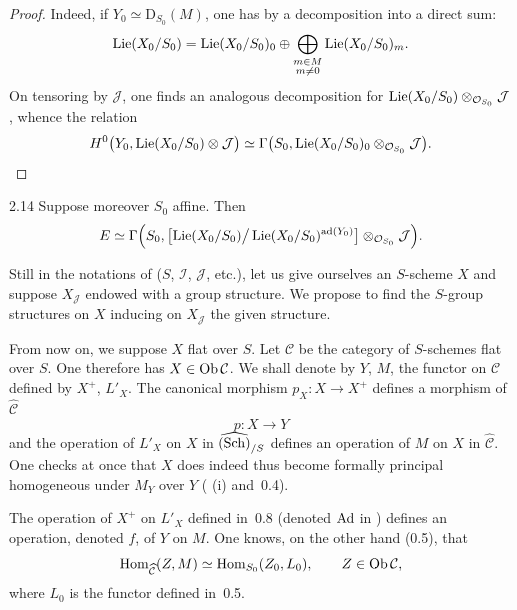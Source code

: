 \begin{proof}
\renewcommand{\qedsymbol}{}
Indeed, if \(Y_{0}\simeq\mathrm{D}_{S_{0}}(M)\), one has by \loccit a
decomposition into a direct sum:
\[
\operatorname{Lie}(X_{0}/S_{0})
  =\operatorname{Lie}(X_{0}/S_{0})_{0}
  \oplus
  \bigoplus_{\substack{m\in M\\ m\neq 0}}\operatorname{Lie}(X_{0}/S_{0})_{m}.
\]
On tensoring by \(\mathcal{J}\), one finds an analogous decomposition for
\(\operatorname{Lie}(X_{0}/S_{0})\otimes_{\mathcal{O}_{S_{0}}}\mathcal{J}\), whence the
relation
\[
H^{0}\bigl(Y_{0},\operatorname{Lie}(X_{0}/S_{0})\otimes\mathcal{J}\bigr)
  \simeq
  \Gamma\bigl(S_{0},\operatorname{Lie}(X_{0}/S_{0})_{0}\otimes_{\mathcal{O}_{S_{0}}}
    \mathcal{J}\bigr).
\]
\end{proof}

\begin{corollary}{2.14}\label{III.2.14}
Suppose moreover \(S_{0}\) affine. Then
\[
E\simeq\Gamma\Bigl(S_{0},
  \bigl[\operatorname{Lie}(X_{0}/S_{0})\big/\operatorname{Lie}(X_{0}/S_{0})^{\mathrm{ad}(Y_{0})}\bigr]
  \otimes_{\mathcal{O}_{S_{0}}}\mathcal{J}\Bigr).
\]
\end{corollary}

\label{III.sec.3}

Still in the notations of  (\(S\), \(\mathcal{I}\), \(\mathcal{J}\),
etc.), let us give ourselves an \(S\)-scheme \(X\) and suppose \(X_{\mathcal{J}}\)
endowed with a group structure. We propose to find the \(S\)-group structures
on \(X\) inducing on \(X_{\mathcal{J}}\) the given structure.

From now on, we suppose \(X\) flat over \(S\). Let \(\mathcal{C}\) be the
category of \(S\)-schemes flat over \(S\). One therefore has
\(X\in\operatorname{Ob}\mathcal{C}\). We shall denote by \(Y\), \resp \(M\), the functor on
\(\mathcal{C}\) defined by \(X^{+}\), \resp \(L'_{X}\). The canonical morphism
\(p_{X}\colon X\to X^{+}\) defines a morphism of \(\widehat{\mathcal{C}}\)
\[
p\colon X\longrightarrow Y
\]
and the operation of \(L'_{X}\) on \(X\) in \(\widehat{\textup{(Sch)}}_{/S}\) defines an
operation of \(M\) on \(X\) in \(\widehat{\mathcal{C}}\). One checks at once
that \(X\) does indeed thus become formally principal homogeneous under
\(M_{Y}\) over \(Y\) ( (i) and~0.4).

The operation of \(X^{+}\) on \(L'_{X}\) defined in~0.8 (denoted \(\operatorname{Ad}\) in
\loccit) defines an operation, denoted \(f\), of \(Y\) on \(M\). One knows, on
the other hand (0.5), that
\[
\operatorname{Hom}_{\widehat{\mathcal{C}}}(Z,M)\simeq\operatorname{Hom}_{S_{0}}(Z_{0},L_{0}),
  \qquad Z\in\operatorname{Ob}\mathcal{C},
\]
where \(L_{0}\) is the functor defined in~0.5.

